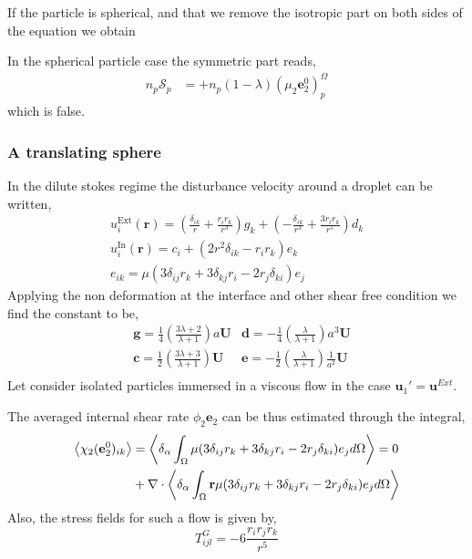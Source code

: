 If the particle is spherical, and that we remove the isotropic part on both sides of the equation we obtain 

In the spherical particle case the symmetric part reads, 
\begin{align*}
    n_p \mathscr{S}_p
    &= 
    + n_p (1 - \lambda)\left(
        \mu_2 \textbf{e}_2^0
    \right)_p^\Omega 
\end{align*}
which is false. 

\subsubsection{A translating sphere}
In the dilute stokes regime the disturbance velocity around a droplet can be written, 
\begin{align*}
    u_i^\text{Ext}(\textbf{r})
    = \left(\frac{\delta_{ik}}{r} + \frac{r_ir_k}{r^3}\right)  g_k
    + \left(-\frac{\delta_{ik}}{r^3} + \frac{3r_ir_k}{r^5}\right)  d_k\\
    u_i^\text{In}(\textbf{r})
    = c_i
    + \left(2 r^2 \delta_{ik} - r_ir_k\right) e_k\\
    e_{ik}
    = \mu(
        3 \delta_{ij} r_k 
        + 3 \delta_{kj} r_i
        -2 r_j \delta_{ki}
    )e_j 
\end{align*}
Applying the non deformation at the interface and other shear free condition we find the constant to be, 
\begin{align*}
    &\textbf{g} = \frac{1}{4}\left(\frac{3\lambda + 2}{\lambda +1}\right) a \textbf{U}
    &\textbf{d} = -\frac{1}{4}\left(\frac{\lambda}{\lambda +1}\right) a^3 \textbf{U}\\
    &\textbf{c} = \frac{1}{2}\left(\frac{3\lambda + 3}{\lambda +1}\right) \textbf{U}
    &\textbf{e} = -\frac{1}{2}\left(\frac{\lambda}{\lambda +1}\right) \frac{1}{a^2} \textbf{U}\\
\end{align*}
Let consider isolated particles immersed in a viscous flow in the case $\textbf{u}_1' = \textbf{u}^{Ext}$.

The averaged internal shear rate $\phi_2 \textbf{e}_2$ can be thus estimated through the integral, 
\begin{align*}
    \left<\chi_2 (\textbf{e}_2^0)_{ik}\right>
    &= \left<\delta_\alpha \int_{\Omega} \mu(
        3 \delta_{ij} r_k 
        + 3 \delta_{kj} r_i
        -2 r_j \delta_{ki}
    )e_j d\Omega\right>
    = 0\\
    &+ \mathbf{\nabla}\cdot \left<\delta_\alpha \int_{\Omega} \textbf{r}\mu(
        3 \delta_{ij} r_k 
        + 3 \delta_{kj} r_i
        -2 r_j \delta_{ki}
    )e_j d\Omega\right>
\end{align*}
Also, the stress fields for such a flow is given by, 
\begin{equation*}
    T^G_{ijl} 
    = -6\frac{r_ir_jr_k}{r^5}
\end{equation*}

